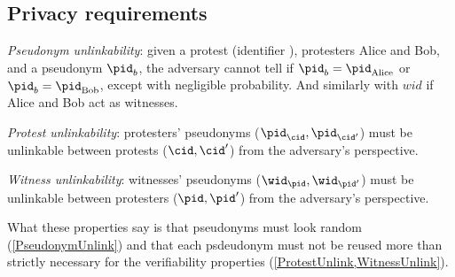\subsection{Privacy requirements}%
\label{privacy-properties}


\begin{requirements}[P]
\item\label{PseudonymUnlink} \emph{Pseudonym unlinkability}: given a protest 
  (identifier \cid), protesters Alice and Bob, and a pseudonym \(\pid_b\), the 
  adversary cannot tell if \(\pid_b = \pid_{\text{Alice}}\) or \(\pid_b = 
    \pid_{\text{Bob}}\), except with negligible probability. And similarly with $wid$ if Alice and Bob act as witnesses.
\item\label{ProtestUnlink} \emph{Protest unlinkability}: protesters' pseudonyms 
  (\(\pid_\cid, \pid_{\cid'}\)) must be unlinkable between protests (\(\cid, 
    \cid'\)) from the adversary's perspective.
\item\label{WitnessUnlink}\emph{Witness unlinkability}:  witnesses' pseudonyms 
  (\(\wid_\pid, \wid_{\pid'}\)) must be unlinkable between protesters (\(\pid, 
    \pid'\)) from the adversary's perspective.
\end{requirements}

What these properties say is that pseudonyms must look random 
(\cref{PseudonymUnlink}) and that each psdeudonym must not be reused
more than strictly necessary for the verifiability properties 
(\cref{ProtestUnlink,WitnessUnlink}).
